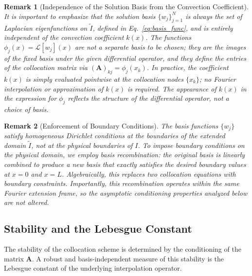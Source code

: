 \documentclass[pdflatex,sn-mathphys-num]{sn-jnl}%
\theoremstyle{thmstyleone}%
\newtheorem{remark}{Remark}
\newcommand{\mat}[1]{\mathbf{#1}}
\begin{document}
\begin{remark}[Independence of the Solution Basis from the Convection Coefficient]
\label{rem:basis_independence}
It is important to emphasize that the \emph{solution basis} $\{w_j\}_{j=1}^N$ is always the set of Laplacian eigenfunctions on $\tilde{I}$, defined in Eq.~\eqref{eq:basis_func}, and is entirely independent of the convection coefficient $k(x)$. The functions $\phi_j(x) = \mathcal{L}[w_j](x)$ are \emph{not} a separate basis to be chosen; they are the images of the fixed basis under the given differential operator, and they define the entries of the collocation matrix via $(\mat{A})_{kj} = \phi_j(x_k)$. In practice, the coefficient $k(x)$ is simply evaluated pointwise at the collocation nodes $\{x_k\}$; no Fourier interpolation or approximation of $k(x)$ is required. The appearance of $k(x)$ in the expression for $\phi_j$ reflects the structure of the differential operator, not a choice of basis.
\end{remark}

\begin{remark}[Enforcement of Boundary Conditions]
\label{rem:boundary_conditions}
The basis functions $\{w_j\}$ satisfy homogeneous Dirichlet conditions at the boundaries of the \emph{extended} domain $\tilde{I}$, not at the physical boundaries of $I$. To impose boundary conditions on the physical domain, we employ basis recombination: the original basis is linearly combined to produce a new basis that exactly satisfies the desired boundary values at $x=0$ and $x=L$. Algebraically, this replaces two collocation equations with boundary constraints. Importantly, this recombination operates within the same Fourier extension frame, so the asymptotic conditioning properties analyzed below are not altered.
\end{remark}
\subsection{Stability and the Lebesgue Constant}

The stability of the collocation scheme is determined by the conditioning of the matrix $\mat{A}$. A robust and basis-independent measure of this stability is the Lebesgue constant of the underlying interpolation operator.
\end{document}
